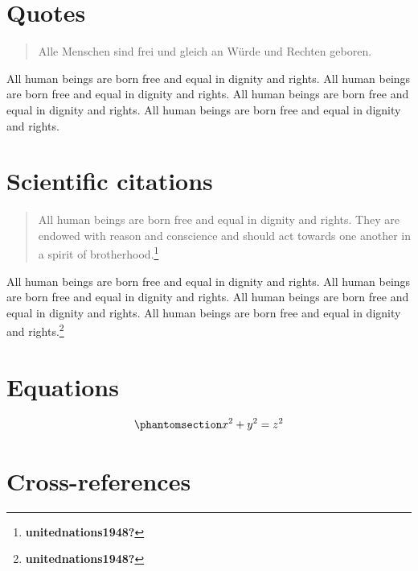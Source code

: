 \documentclass[
  ngerman,
  american,
  titlepage,
  openright,
  DIV=calc,
  toc=listof,
  listof=nochaptergap]{scrbook}
\newcommand{\citeproc}[2]{#2}
\begin{document}
\section{Quotes}\label{quotes}

\begin{otherlanguage}{ngerman}

\begin{quote}
Alle Menschen sind frei und gleich an Würde und Rechten geboren.
\end{quote}

\end{otherlanguage}

All human beings are born free and equal in dignity and rights. All
human beings are born free and equal in dignity and rights. All human
beings are born free and equal in dignity and rights. All human beings
are born free and equal in dignity and rights.

\section{Scientific citations}\label{scientific-citations}

\begin{quote}
All human beings are born free and equal in dignity and rights. They are
endowed with reason and conscience and should act towards one another in
a spirit of brotherhood.\footnote{\citeproc{ref-unitednations1948}{\textbf{unitednations1948?}}}
\end{quote}

All human beings are born free and equal in dignity and rights. All
human beings are born free and equal in dignity and rights. All human
beings are born free and equal in dignity and rights. All human beings
are born free and equal in dignity and rights.\footnote{\citeproc{ref-unitednations1948}{\textbf{unitednations1948?}}}

\section{Equations}\label{equations}

\begin{equation}\protect\phantomsection\label{eq-pythagoras}{x^2 + y^2 = z^2}\end{equation}

\section{Cross-references}\label{cross-references}
\end{document}
